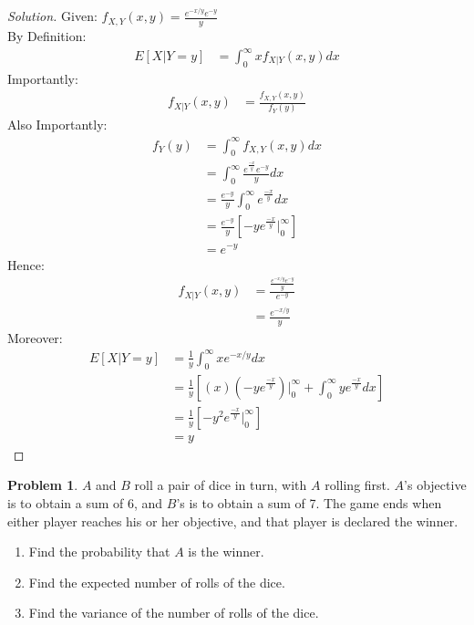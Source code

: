\documentclass[10pt]{article}
\theoremstyle{definition}
\newtheorem{problem}{Problem}
\begin{document}
\begin{proof}[Solution]
Given: $f_{X,Y}(x,y) = \frac{e^{-x/y}e^{-y}}{y}$\\
By Definition:
\begin{align*}
    E[X|Y=y] &= \int_0^\infty xf_{X|Y}(x,y)dx
\end{align*}
Importantly:
\begin{align*}
    f_{X|Y}(x,y) &= 
        \frac{f_{X,Y}(x,y)}{f_{Y}(y)}
\end{align*}
Also Importantly:
\begin{align*}
    f_{Y}(y) &=  \int_0^\infty f_{X,Y}(x,y)dx\\
    &=  \int_0^\infty \frac{e^{\frac{-x}{y}} e^{-y}}{y}dx\\
    &= \frac{e^{-y}}{y}\int_0 ^\infty e^{\frac{-x}{y}}dx\\
    &= \frac{e^{-y}}{y} [-y e^{\frac{-x}{y}}{} \bigg|_0 ^\infty]\\
    &= e^{-y}
\end{align*}
Hence:
\begin{align*}
    f_{X|Y}(x,y) &= \frac{\frac{e^{-x/y}e^{-y}}{y}}{e^{-y}}\\
    &= \frac{e^{-x/y}}{y}
\end{align*}
Moreover:
\begin{align*}
     E[X|Y=y] &= \frac{1}{y}\int_0^\infty x e^{-x/y}dx\\
     &= \frac{1}{y}[(x)(-ye^{\frac{-x}{y}})\bigg | _0 ^\infty + \int_0 ^\infty ye^{\frac{-x}{y}}dx]\\
     &= \frac{1}{y}[-y^2 e^{\frac{-x}{y}}\bigg|_0 ^\infty]\\
     &= y
\end{align*}
\end{proof}








\begin{problem}
$A$ and $B$ roll a pair of dice in turn, with $A$ rolling first. $A$'s objective is to obtain
a sum of 6, and $B$'s is to obtain a sum of 7. The game ends when either player
reaches his or her objective, and that player is declared the winner.
\begin{enumerate}[label=(\alph*)]
\item Find the probability that $A$ is the winner.
\item Find the expected number of rolls of the dice.
\item Find the variance of the number of rolls of the dice.
\end{enumerate}
\end{problem}
\end{document}
